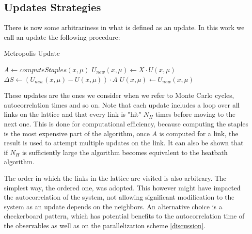 \begin{figure}[!htb]

    \label{fig:staples}
\end{figure}


\subsection{Updates Strategies}
There is now some arbitrariness in what is defined as an update. In this work we call an update the following procedure:
\begin{algorithm}
    \caption{Metropolis Update}\label{metropolis:update}
    \begin{algorithmic}[1]
        \State $A \gets computeStaples(x,\mu)$     
            \State $U_{new}(x,\mu)  \gets X\cdot U(x,\mu)$  
            \State $\Delta S \gets (U_{new}(x,\mu)  - U(x,\mu) )\cdot A$
                \State $U(x,\mu)  \gets U_{new}(x,\mu)$
            \EndIf
        \EndFor
    \EndFor
\end{algorithmic}
\end{algorithm}

These updates are the ones we consider when we refer to Monte Carlo cycles, autocorrelation times and so on. Note that each update includes a loop over all links on the lattice and that every link is "hit" $N_H$ times before moving to the next one. This is done for computational efficiency, because computing the staples is the most expensive part of the algorithm, once $A$ is computed for a link, the result is used to attempt multiple updates on the link. It can also be shown that if $N_H$ is sufficiently large the algorithm becomes equivalent to the heatbath algorithm. 

The order in which the links in the lattice are visited is also arbitrary. The simplest way, the ordered one, was adopted. This however might have impacted the autocorrelation of the system, not allowing significant modification to the system as an update depends on the neighbors. An alternative choice is a checkerboard pattern, which has potential benefits to the autocorrelation time of the observables as well as on the parallelization scheme \cref{discussion}. 

